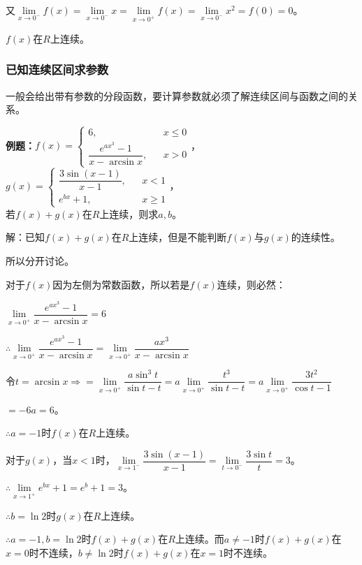又$\lim\limits_{x\to 0^-}f(x)=\lim\limits_{x\to 0^-}x=\lim\limits_{x\to 0^+}f(x)=\lim\limits_{x\to 0^-}x^2=f(0)=0$。

$f(x)$在$R$上连续。

\subsubsection{已知连续区间求参数}

一般会给出带有参数的分段函数，要计算参数就必须了解连续区间与函数之间的关系。

\textbf{例题：}$f(x)=\left\{\begin{array}{lcl}
        6,                               &  & x\leqslant 0 \\
    \dfrac{e^{ax^3}-1}{x-\arcsin x}, &  & x>0
    \end{array}
    \right.$，$g(x)=\left\{\begin{array}{lcl}
        \dfrac{3\sin(x-1)}{x-1}, &  & x<1          \\
        e^{bx}+1,                &  & x\geqslant 1
    \end{array}
    \right.$，\smallskip \\ 若$f(x)+g(x)$在$R$上连续，则求$a,b$。

解：已知$f(x)+g(x)$在$R$上连续，但是不能判断$f(x)$与$g(x)$的连续性。

所以分开讨论。

对于$f(x)$因为左侧为常数函数，所以若是$f(x)$连续，则必然：\medskip

$\lim\limits_{x\to 0^+}\dfrac{e^{ax^3}-1}{x-\arcsin x}=6$\medskip

$\therefore\lim\limits_{x\to 0^+}\dfrac{e^{ax^3}-1}{x-\arcsin x}=\lim\limits_{x\to 0^+}\dfrac{ax^3}{x-\arcsin x}$\medskip

$\text{令}t=\arcsin x\Rightarrow=\lim\limits_{x\to 0^+}\dfrac{a\sin^3t}{\sin t-t}=a\lim\limits_{x\to 0^+}\dfrac{t^3}{\sin t-t}=a\lim\limits_{x\to 0^+}\dfrac{3t^2}{\cos t-1}$

$=-6a=6$。

$\therefore a=-1$时$f(x)$在$R$上连续。\medskip

对于$g(x)$，当$x<1$时，$\lim\limits_{x\to 1^-}\dfrac{3\sin(x-1)}{x-1}=\lim\limits_{t\to 0^-}\dfrac{3\sin t}{t}=3$。\medskip

$\therefore\lim\limits_{x\to 1^+}e^{bx}+1=e^b+1=3$。\medskip

$\therefore b=\ln 2$时$g(x)$在$R$上连续。\medskip

$\therefore a=-1,b=\ln 2$时$f(x)+g(x)$在$R$上连续。而$a\neq -1$时$f(x)+g(x)$在$x=0$时不连续，$b\neq\ln 2$时$f(x)+g(x)$在$x=1$时不连续。

